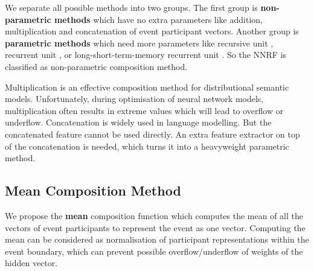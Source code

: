 \documentclass[a4paper]{article}
\begin{document}
We separate all possible methods into two groups. The first group is \textbf{non-parametric methods} which have no extra parameters like addition, multiplication and concatenation of event participant vectors. Another group is \textbf{parametric methods} which need more parameters like recursive unit \citep{socher2013recursive}, recurrent unit \citet{mikolov2010recurrent}, or long-short-term-memory recurrent unit \citep{hochreiter1997LSTM}. So the NNRF is classified as non-parametric composition method. 

Multiplication is an effective composition method for distributional semantic models. Unfortunately, during optimisation of neural network models, multiplication often results in extreme values which will lead to overflow or underflow. Concatenation is widely used in language modelling. But the concatenated feature cannot be used directly. An extra feature extractor on top of the concatenation is needed, which turns it into a heavyweight parametric method. 
% 
% 
% 
%
% 
%
% 
%
% 
%


\subsection{Mean Composition Method} \label{sec:mean-composition}
We propose the \textbf{mean} composition function which computes the mean of all the vectors of event participants to represent the event as one vector. Computing the mean can be considered as normalisation of participant representations within the event boundary, which can prevent possible overflow/underflow of weights of the hidden vector. 
\end{document}

